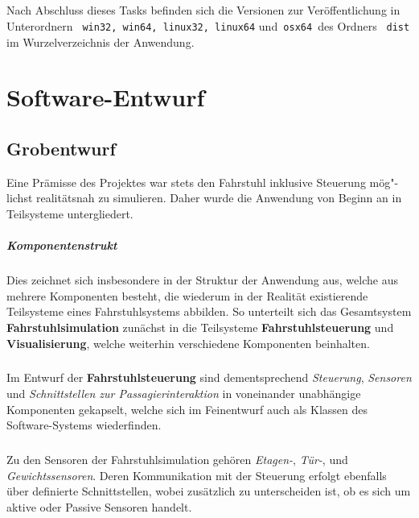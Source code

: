 \paragraph{}Nach Abschluss dieses Tasks befinden sich die Versionen zur Veröffentlichung in Unterordnern \texttt{ win32, win64, linux32, linux64} und\texttt{ osx64 }des Ordners \texttt{ dist } im Wurzelverzeichnis der Anwendung.

\chapter{Software-Entwurf}
\section{Grobentwurf}
Eine Prämisse des Projektes war stets den Fahrstuhl inklusive Steuerung mög"-lichst realitätsnah zu simulieren. Daher wurde die Anwendung von Beginn an in Teilsysteme untergliedert.

\paragraph{Komponentenstrukt}Dies zeichnet sich insbesondere in der Struktur der Anwendung aus, welche aus mehrere Komponenten besteht, die wiederum in der Realität existierende Teilsysteme eines Fahrstuhlsystems abbilden. So unterteilt sich das Gesamtsystem \textbf{Fahrstuhlsimulation} zunächst in die Teilsysteme \textbf{Fahrstuhlsteuerung} und \textbf{Visualisierung}, welche weiterhin verschiedene Komponenten beinhalten.

\paragraph{}Im Entwurf der \textbf{Fahrstuhlsteuerung} sind dementsprechend \textit{Steuerung}, \textit{Sensoren} und \textit{Schnittstellen zur Passagierinteraktion} in voneinander unabhängige Komponenten gekapselt, welche sich im Feinentwurf auch als Klassen des Software-Systems wiederfinden.

\paragraph{}Zu den Sensoren der Fahrstuhlsimulation gehören \textit{Etagen-}, \textit{Tür-}, und \textit{Gewichtssensoren}. Deren Kommunikation mit der Steuerung erfolgt ebenfalls über definierte Schnittstellen, wobei zusätzlich zu unterscheiden ist, ob es sich um aktive oder Passive Sensoren handelt.


